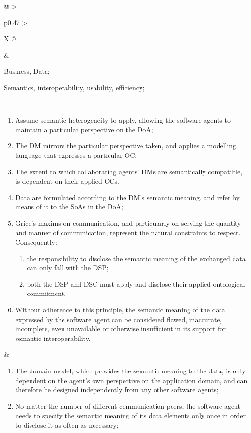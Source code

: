 \begin{xltabular}[l]{\linewidth}{@{} >{\small\raggedright\arraybackslash}p{0.47\linewidth} >{\small\raggedright\arraybackslash}X @{}}
\begin{mmdp}
\end{mmdp}
&
\begin{description}[labelwidth=3.7cm,leftmargin=3.7cm+1ex,nosep,topsep=2ex,labelsep=1ex,font=\bfseries]
  \item[Type of information:] Business, Data;
  \item[Quality attributes:] Semantics, interoperability, usability, efficiency;
\end{description} \\
\begin{enumerate}[left=6pt, nosep]
  \item Assume semantic heterogeneity to apply, allowing the software agents to maintain a particular perspective on the DoA;
  \item The DM mirrors the particular perspective taken, and applies a modelling language that expresses a particular OC;
  \item The extent to which collaborating agents' DMs are semantically compatible, is dependent on their applied OCs. 
  \item Data are formulated according to the DM's semantic meaning, and refer by means of it to the SoAs in the DoA;
  \item Grice’s maxims on communication, and particularly on serving the quantity and manner of communication, represent the natural constraints to respect. Consequently:
  \begin{enumerate}
    \item the responsibility to disclose the semantic meaning of the exchanged data can only fall with the DSP;
    \item both the DSP and DSC must apply and disclose their applied ontological commitment.
  \end{enumerate}
  \item Without adherence to this principle, the semantic meaning of the data expressed by the software agent can be considered flawed, inaccurate, incomplete, even unavailable or otherwise insufficient in its support for semantic interoperability.
\end{enumerate}
&
\begin{enumerate}[left=10pt, nosep]
  \item The domain model, which provides the semantic meaning to the data, is only dependent on the agent's own perspective on the application domain, and can therefore be designed independently from any other software agents;
  \item No matter the number of different communication peers, the software agent needs to specify the semantic meaning of its data elements only once in order to disclose it as often as necessary;

\end{enumerate}
\end{xltabular}
